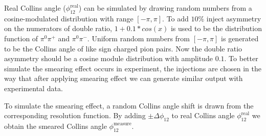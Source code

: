 Real Collins angle ($\phi_{12}^{\text{real}}$) can be simulated by drawing random numbers from a cosine-modulated distribution with range $[-\pi,\pi]$. To add $10\%$ inject asymmetry on the numerators of double ratio, $1+0.1*cos(x)$ is used to be the distribution function of $\pi^0\pi^+$ and $\pi^0\pi^-$. Uniform random numbers from $[-\pi,\pi]$ is generated to be the Collins angle of like sign charged pion pairs. Now the double ratio asymmetry should be a cosine module distribution with amplitude $0.1$. To better simulate the smearing effect occurs in experiment, the injections are chosen in the way that after applying smearing effect we can generate similar output with experimental data.

To simulate the smearing effect, a random Collins angle shift is drawn from the corresponding resolution function. By adding $\pm\Delta\phi_{12}$ to real Collins angle $\phi_{12}^{\text{real}}$ we obtain the smeared Collins angle $\phi_{12}^{\text{measure}}$. 

